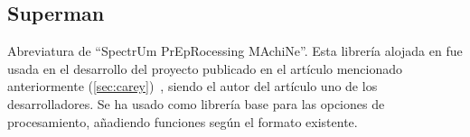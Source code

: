 \subsection{Superman}\label{lib:superman}

Abreviatura de ``SpectrUm PrEpRocessing MAchiNe''. Esta librería alojada en
 fue usada en el
desarrollo del proyecto publicado en el artículo mencionado anteriormente
(\ref{sec:carey})~\cite{art:raman-carey}, siendo el autor del artículo uno de
los desarrolladores. Se ha usado como librería base para las opciones de
procesamiento, añadiendo funciones según el formato existente.

